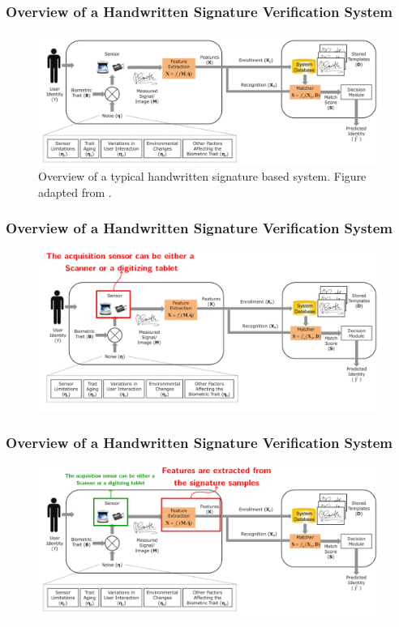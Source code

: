 \documentclass{beamer}
\begin{document}
\begin{frame}
\frametitle{Overview of a Handwritten Signature Verification System}
\begin{figure}[!htb]
\centering
\includegraphics[width=\textwidth]{biometry-overview}
\caption{Overview of a typical handwritten signature based system. Figure adapted from \parencite{jain2016} .}
\label{fig_ahsv-overview}
\end{figure}

\end{frame}

\begin{frame}
\frametitle{Overview of a Handwritten Signature Verification System}
\begin{figure}[!htb]
\centering
\includegraphics[width=\textwidth]{biometryoverview2}

\label{fig_ahsv-overview}
\end{figure}

\end{frame}


\begin{frame}
\frametitle{Overview of a Handwritten Signature Verification System}
\begin{figure}[!htb]
\centering
\includegraphics[width=\textwidth]{biometryoverview3}

\label{fig_ahsv-overview}
\end{figure}

\end{frame}
\end{document}
